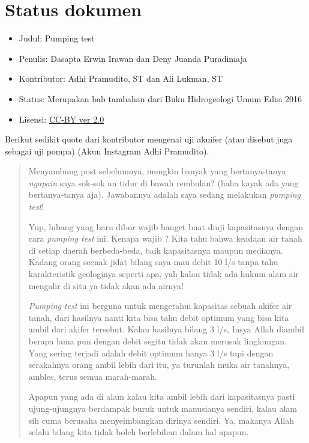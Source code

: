 \section{Status dokumen}

\begin{itemize}
\item Judul: Pumping test
\end{itemize}
\begin{itemize}
\item Penulis: Dasapta Erwin Irawan dan Deny Juanda Puradimaja
\end{itemize}
\begin{itemize}
\item Kontributor: Adhi Pramudito, ST dan Ali Lukman, ST
\end{itemize}
\begin{itemize}
\item Status: Merupakan bab tambahan dari Buku Hidrogeologi Umum Edisi 2016
\end{itemize}
\begin{itemize}
\item Lisensi: \href{http://creativecommons.org/licenses/by/2.0/}{CC-BY ver 2.0}
\end{itemize}

Berikut sedikit quote dari kontributor mengenai uji akuifer (atau disebut juga sebagai uji pompa) (Akun Instagram Adhi Pramudito).

\begin{quote}
Menyambung post sebelumnya, mungkin banyak yang bertanya-tanya \textit{ngapain} saya sok-sok an tidur di bawah rembulan? (haha kayak ada yang bertanya-tanya aja). Jawabannya adalah saya sedang melakukan \textit{pumping test}! 

Yup, lubang yang baru dibor wajib banget buat diuji kapasitasnya dengan cara \textit{pumping test} ini. Kenapa wajib ? Kita tahu bahwa keadaan air tanah di setiap daerah berbeda-beda, baik kapasitasnya maupun medianya. Kadang orang seenak jidat bilang saya mau debit 10 l/s tanpa tahu karakteristik geologinya seperti apa, yah kalau tidak ada hukum alam air mengalir di situ ya tidak akan ada airnya!

\textit{Pumping test} ini berguna untuk mengetahui kapasitas sebuah akifer air tanah, dari hasilnya nanti kita bisa tahu debit optimum yang bisa kita ambil dari akifer tersebut. Kalau hasilnya bilang 3 l/s, Insya Allah diambil berapa lama pun dengan debit segitu tidak akan merusak lingkungan. Yang sering terjadi adalah debit optimum hanya 3 l/s tapi dengan serakahnya orang ambil lebih dari itu, ya turunlah muka air tanahnya, ambles, terus semua marah-marah.

Apapun yang ada di alam kalau kita ambil lebih dari kapasitasnya pasti ujung-ujungnya berdampak buruk untuk manusianya sendiri, kalau alam sih cuma berusaha menyeimbangkan dirinya sendiri. Ya, makanya Allah selalu bilang kita tidak boleh berlebihan dalam hal apapun.
\end{quote}